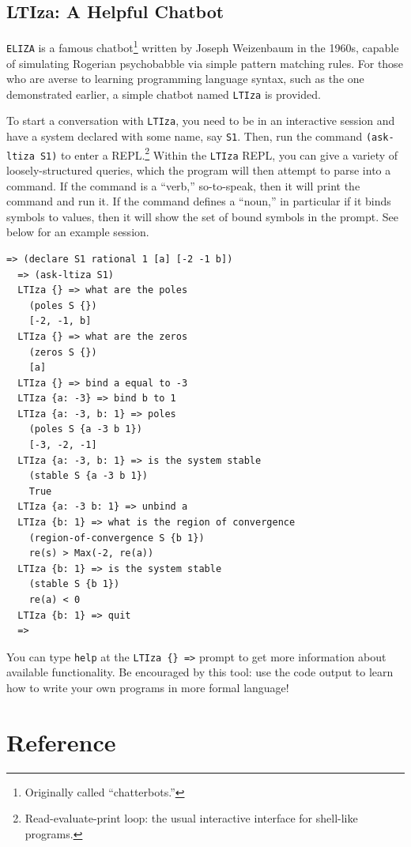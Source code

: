 \documentclass[11pt,letter]{article}
\begin{document}
\newpage

\subsection{LTIza: A Helpful Chatbot}

\lstinline!ELIZA! is a famous chatbot\footnote{Originally called ``chatterbots.''} written by Joseph Weizenbaum in the 1960s, capable of simulating Rogerian psychobabble via simple pattern matching rules.
For those who are averse to learning programming language syntax, such as the one demonstrated earlier, a simple chatbot named \lstinline!LTIza! is provided.

To start a conversation with \lstinline!LTIza!, you need to be in an interactive session and have a system declared with some name, say \lstinline!S1!.
Then, run the command \lstinline!(ask-ltiza S1)! to enter a REPL.\footnote{Read-evaluate-print loop: the usual interactive interface for shell-like programs.}
Within the \lstinline!LTIza! REPL, you can give a variety of loosely-structured queries, which the program will then attempt to parse into a command.
If the command is a ``verb,'' so-to-speak, then it will print the command and run it.
If the command defines a ``noun,'' in particular if it binds symbols to values, then it will show the set of bound symbols in the prompt.
See below for an example session.

\begin{lstlisting}[gobble=2]
  => (declare S1 rational 1 [a] [-2 -1 b])
  => (ask-ltiza S1)
  LTIza {} => what are the poles
    (poles S {})
    [-2, -1, b]
  LTIza {} => what are the zeros
    (zeros S {})
    [a]
  LTIza {} => bind a equal to -3
  LTIza {a: -3} => bind b to 1
  LTIza {a: -3, b: 1} => poles
    (poles S {a -3 b 1})
    [-3, -2, -1]
  LTIza {a: -3, b: 1} => is the system stable
    (stable S {a -3 b 1})
    True
  LTIza {a: -3 b: 1} => unbind a
  LTIza {b: 1} => what is the region of convergence
    (region-of-convergence S {b 1})
    re(s) > Max(-2, re(a))
  LTIza {b: 1} => is the system stable
    (stable S {b 1})
    re(a) < 0
  LTIza {b: 1} => quit
  =>
\end{lstlisting}

You can type \lstinline!help! at the \lstinline!LTIza {} =>! prompt to get more information about available functionality.
Be encouraged by this tool: use the code output to learn how to write your own programs in more formal language!

\section{Reference}\label{sec:reference}
\end{document}
